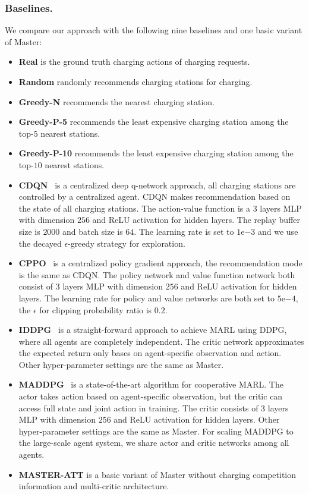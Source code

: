 \documentclass[sigconf]{acmart}
\newcommand{\stddpg}{{\sc Master}\xspace}
\begin{document}
\subsubsection{Baselines.} 
We compare our approach with the following nine
baselines and one basic variant of \stddpg:
\begin{itemize}
	\item \textbf{Real} is the ground truth charging actions of charging requests.
	\item \textbf{Random} randomly recommends charging stations for charging.
	\item \textbf{Greedy-N} recommends the nearest charging station.
	\item \textbf{Greedy-P-5} recommends the least expensive charging station among the top-$5$ nearest stations.
	\item \textbf{Greedy-P-10} recommends the least expensive charging station among the top-$10$ nearest stations.
	\item \textbf{CDQN}~\cite{mnih2015human} is a centralized deep q-network approach, all charging stations are controlled by a centralized agent. CDQN makes recommendation based on the state of all charging stations. The action-value function is a $3$ layers MLP with dimension $256$ and ReLU activation for hidden layers. The replay buffer size is $2000$ and batch size is $64$. The learning rate is set to $1\mathrm{e}{-3}$ and we use the decayed $\epsilon$-greedy strategy for exploration.
	\item \textbf{CPPO}~\cite{schulman2017proximal} is a centralized policy gradient approach, the recommendation mode is the same as CDQN. The policy network and value function network both consist of $3$ layers MLP with dimension $256$ and ReLU activation for hidden layers. The learning rate for policy and value networks are both set to $5\mathrm{e}{-4}$, the $\epsilon$ for clipping probability ratio is $0.2$.
	\item \textbf{IDDPG}~\cite{lillicrap2015continuous} is a straight-forward approach to achieve MARL using DDPG, where all agents are completely independent. The critic network
	approximates the expected return only bases on agent-specific observation and action. Other hyper-parameter settings are the same as \stddpg.
	\item \textbf{MADDPG}~\cite{lowe2017multi} is a state-of-the-art algorithm for cooperative MARL. The actor takes action based on agent-specific observation, but the critic can access full state and joint action in training. The critic consists of $3$ layers MLP with dimension $256$ and ReLU activation for hidden layers. Other hyper-parameter settings are the same as \stddpg.
	For scaling MADDPG to the large-scale agent system, we share actor and critic networks among all agents. 
	\item \textbf{MASTER-ATT} is a basic variant of \stddpg without charging competition information and multi-critic architecture. 
\end{itemize}
\end{document}
